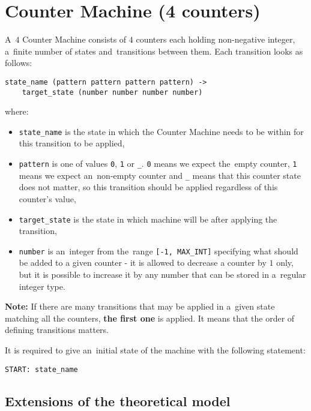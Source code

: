 \documentclass[english,shortabstract,mgr]{iithesis}
\begin{document}
\section {Counter Machine (4 counters)}

A~$4$ Counter Machine consists of $4$ counters each holding non-negative integer,
a~finite number of states and~transitions between them. Each transition
looks as follows:

\begin{verbatim}
state_name (pattern pattern pattern pattern) ->
    target_state (number number number number)
\end{verbatim}

where:
\begin{itemize}
  \item \texttt{state\_name} is the state in which the Counter Machine needs to be
      within for this transition to be applied,
  \item \texttt{pattern} is one of values \texttt{0}, \texttt{1} or \texttt{\_}.
      \texttt{0} means we expect the~empty counter, \texttt{1} means we expect an~non-empty
      counter and \texttt{\_} means that this counter state does not matter, so
      this transition should be applied regardless of this counter's value,
  \item \texttt{target\_state} is the state in which machine will be after
      applying the transition,
  \item \texttt{number} is an~integer from the~range \texttt{[-1, MAX\_INT]} specifying
      what should be added to a given counter - it is allowed to decrease a counter
      by $1$ only, but it is possible to increase it by any number that can be stored
      in a~regular integer type.
\end{itemize}

\textbf{Note:} If there are many transitions that may be applied in a~given state
matching all the counters, \textbf{the first one} is applied. It means that the order
of defining transitions matters.

It is required to give an~initial state of the machine with the following statement:
\begin{verbatim}
START: state_name
\end{verbatim}

\subsection {Extensions of the theoretical model}
\end{document}
